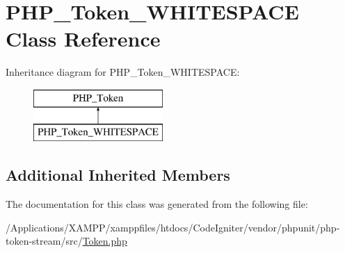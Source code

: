 \hypertarget{class_p_h_p___token___w_h_i_t_e_s_p_a_c_e}{}\section{P\+H\+P\+\_\+\+Token\+\_\+\+W\+H\+I\+T\+E\+S\+P\+A\+CE Class Reference}
\label{class_p_h_p___token___w_h_i_t_e_s_p_a_c_e}
Inheritance diagram for P\+H\+P\+\_\+\+Token\+\_\+\+W\+H\+I\+T\+E\+S\+P\+A\+CE\+:\begin{figure}[H]
\begin{center}
\leavevmode
\includegraphics[height=2.000000cm]{class_p_h_p___token___w_h_i_t_e_s_p_a_c_e}
\end{center}
\end{figure}
\subsection*{Additional Inherited Members}


The documentation for this class was generated from the following file\+:\begin{DoxyCompactItemize}
\item 
/\+Applications/\+X\+A\+M\+P\+P/xamppfiles/htdocs/\+Code\+Igniter/vendor/phpunit/php-\/token-\/stream/src/\mbox{\hyperlink{_token_8php}{Token.\+php}}\end{DoxyCompactItemize}
